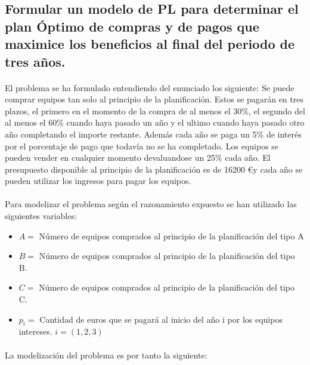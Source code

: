 \documentclass[10pt, a4paper]{article}
\begin{document}
		\subsection{Formular un modelo de PL para determinar el plan Óptimo de compras y de pagos que maximice los beneficios al final del periodo de tres años.}

			\paragraph{}
			El problema se ha formulado entendiendo del enunciado los siguiente: Se puede comprar equipos tan solo al principio de la planificación. Estos se pagarán en tres plazos, el primero en el momento de la compra de al menos el 30\%, el segundo del al menos el 60\% cuando haya pasado un año y el ultimo cuando haya pasado otro año completando el importe restante. Además cada año se paga un 5\% de interés por el porcentaje de pago que todavía no se ha completado. Los equipos se pueden vender en cualquier momento devaluandose un 25\% cada año. El presupuesto disponible al principio de la planificación es de 16200 \euro y cada año se pueden utilizar los ingresos para pagar los equipos.

			\paragraph{}
			Para modelizar el problema según el razonamiento expuesto se han utilizado las siguientes variables:

			\begin{itemize}
				\item \(A = \) Número de equipos comprados al principio de la planificación del tipo A

				\item \(B = \) Número de equipos comprados al principio de la planificación del tipo B.

				\item \(C = \) Número de equipos comprados al principio de la planificación del tipo C.

				\item \(p_{i} = \) Cantidad de euros que se pagará al inicio del año i por los equipos intereses. \(i = (1,2,3)\)
			\end{itemize}

			\paragraph{}
			La modelización del problema es por tanto la siguiente:
\end{document}

